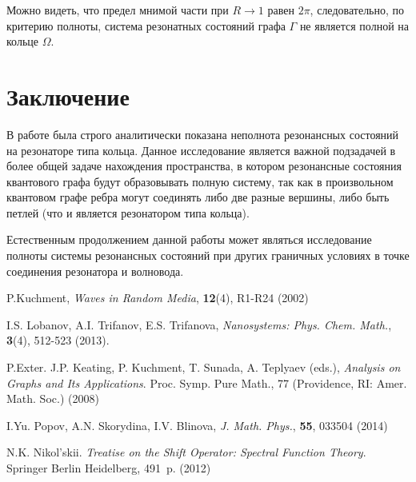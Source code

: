 \documentclass{nsart_eng}
\begin{document}
Можно видеть, что предел мнимой части при $R \to 1$ равен $2 \pi$, следовательно, по критерию полноты, система резонатных состояний графа $\Gamma$ не является полной на кольце $\Omega$.


\section{Заключение}
В работе была строго аналитически показана неполнота резонансных состояний на резонаторе типа кольца. Данное исследование является важной подзадачей в более общей задаче нахождения пространства, в котором резонансные состояния квантового графа будут образовывать полную систему, так как в произвольном квантовом графе ребра могут соединять либо две разные вершины, либо быть петлей (что и является резонатором типа кольца).

Естественным продолжением данной работы может являться исследование полноты системы резонансных состояний при других граничных условиях в точке соединения резонатора и волновода.


\begin{thebibliography}{99}
 P.Kuchment, \textit{Waves in Random Media}, \textbf{12}(4), R1-R24 (2002)

 I.S. Lobanov, A.I. Trifanov, E.S. Trifanova, \textit{Nanosystems: Phys. Chem. Math.}, \textbf{3}(4), 512-523 (2013).

 P.Exter. J.P. Keating, P. Kuchment, T. Sunada, A. Teplyaev (eds.), \textit{Analysis on Graphs and Its Applications}. Proc. Symp. Pure Math., 77 (Providence, RI: Amer. Math. Soc.) (2008)

 I.Yu. Popov, A.N. Skorydina, I.V. Blinova, \textit{J. Math. Phys.}, \textbf{55}, 033504 (2014)

 N.K. Nikol'skii. {\it Treatise on the Shift Operator: Spectral Function Theory}.  Springer Berlin Heidelberg,  491~p. (2012)





\end{thebibliography}
\end{document}
